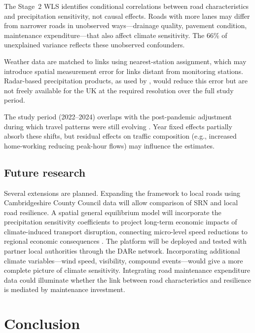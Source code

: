 \documentclass[review]{elsarticle}
\begin{document}
The Stage~2 WLS identifies conditional correlations between road characteristics and precipitation sensitivity, not causal effects. Roads with more lanes may differ from narrower roads in unobserved ways---drainage quality, pavement condition, maintenance expenditure---that also affect climate sensitivity. The 66\% of unexplained variance reflects these unobserved confounders.

Weather data are matched to links using nearest-station assignment, which may introduce spatial measurement error for links distant from monitoring stations. Radar-based precipitation products, as used by \citet{becker2026rainfall}, would reduce this error but are not freely available for the UK at the required resolution over the full study period.

The study period (2022--2024) overlaps with the post-pandemic adjustment during which travel patterns were still evolving \citep{wan2024paradox}. Year fixed effects partially absorb these shifts, but residual effects on traffic composition (e.g., increased home-working reducing peak-hour flows) may influence the estimates.

\subsection{Future research}
\label{sec:disc:future}

Several extensions are planned. Expanding the framework to local roads using Cambridgeshire County Council data will allow comparison of SRN and local road resilience. A spatial general equilibrium model will incorporate the precipitation sensitivity coefficients to project long-term economic impacts of climate-induced transport disruption, connecting micro-level speed reductions to regional economic consequences \citep{ganin2017resilience}. The platform will be deployed and tested with partner local authorities through the DARe network. Incorporating additional climate variables---wind speed, visibility, compound events---would give a more complete picture of climate sensitivity. Integrating road maintenance expenditure data could illuminate whether the link between road characteristics and resilience is mediated by maintenance investment.


\section{Conclusion}
\label{sec:conclusion}
\end{document}
